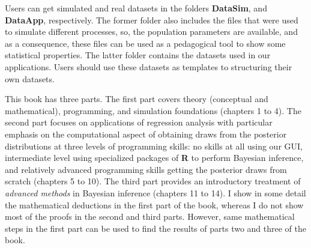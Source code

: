 Users can get simulated and real datasets in the folders \textbf{DataSim}, and \textbf{DataApp}, respectively. The former folder also includes the files that were used to simulate different processes, so, the population parameters are available, and as a consequence, these files can be used as a pedagogical tool to show some statistical properties. The latter folder contains the datasets used in our applications. Users should use these datasets as templates to structuring their own datasets. 

This book has three parts. The first part covers theory (conceptual and mathematical), programming, and simulation foundations (chapters 1 to 4). The second part focuses on applications of regression analysis with particular emphasis on the computational aspect of obtaining draws from the posterior distributions at three levels of programming skills: no skills at all using our GUI, intermediate level using specialized packages of \textbf{R} to perform Bayesian inference, and relatively advanced programming skills getting the posterior draws from scratch (chapters 5 to 10). The third part provides an introductory treatment of \textit{advanced methods} in Bayesian inference (chapters 11 to 14). I show in some detail the mathematical deductions in the first part of the book, whereas I do not show most of the proofs in the second and third parts. However, same mathematical steps in the first part can be used to find the results of parts two and three of the book.

